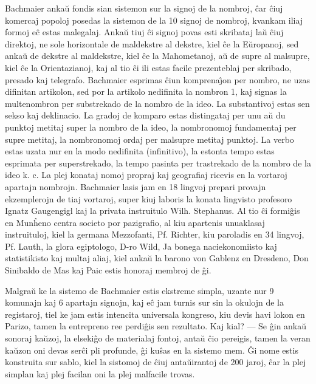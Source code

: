    Bachmaier anka\u u fondis sian sistemon sur la signoj de la nombroj,
\^car \^ciuj komercaj popoloj posedas la sistemon de la 10 signoj de
nombroj, kvankam iliaj formoj e\^c estas malegalaj. Anka\u u tiuj
\^ci signoj povas esti skribataj la\u u \^ciuj direktoj, ne sole
horizontale de maldekstre al dekstre, kiel \^ce la E\u uropanoj, sed
anka\u u de dekstre al maldekstre, kiel \^ce la Mahometanoj, a\u u
de supre al malsupre, kiel \^ce la Orientazianoj, kaj al tio \^ci
ili estas facile prezenteblaj per skribado, presado kaj telegrafo.
Bachmaier esprimas \^ciun komprena\^{\j}on per nombro, ne uzas
difinitan artikolon, sed por la artikolo nedifinita la nombron 1,
kaj signas la multenombron per substrekado de la nombro de la ideo.
La substantivoj estas sen sekso kaj deklinacio. La gradoj de komparo
estas distingataj per unu a\u u du punktoj metitaj super la nombro
de la ideo, la nombronomoj fundamentaj per supre metitaj, la
nombronomoj ordaj per malsupre metitaj punktoj. La verbo estas uzata
nur en la modo nedifinita (infinitivo), la estonta tempo estas
esprimata per superstrekado, la tempo pasinta per trastrekado de la
nombro de la ideo k. c. La plej konataj nomoj propraj kaj geografiaj
ricevis en la vortaroj apartajn nombrojn. Bachmaier lasis jam en 18
lingvoj prepari provajn ekzemplerojn de tiaj vortaroj, super kiuj
laboris la konata lingvisto profesoro Ignatz Gaugengigl kaj la
privata instruitulo Wilh. Stephanus. Al tio \^ci formi\^gis en
Mun\^heno centra societo por pazigrafio, al kiu apartenis unuaklasaj
instruituloj, kiel la germana Mezzofanti, Pf. Richter, kiu paroladis
en 34 lingvoj, Pf. Lauth, la glora egiptologo, D-ro Wild, Ja bonega
naciekonomiisto kaj statistikisto kaj multaj aliaj, kiel anka\u u la
barono von Gablenz en Dresdeno, Don Sinibaldo de Mas kaj Paic estis
honoraj membroj de \^gi.

   Malgra\u u ke la sistemo de Bachmaier estis ekstreme simpla, uzante nur
9 komunajn kaj 6 apartajn signojn, kaj e\^c jam turnis sur sin la
okulojn de la registaroj, tiel ke jam estis intencita universala
kongreso, kiu devis havi lokon en Parizo, tamen la entrepreno ree
perdi\^gis sen rezultato. Kaj kial? --- Se \^gin anka\u u sonoraj
ka\u uzoj, la elseki\^go de materialaj fontoj, anta\u u \^cio
pereigis, tamen la veran ka\u uzon oni devas ser\^ci pli profunde,
\^gi ku\^sas en la sistemo mem. \^Gi nome estis konstruita sur
sablo, kiel la sistomoj de \^ciuj anta\u uirantoj de 200 jaroj,
\^car la plej simplan kaj plej facilan oni la plej malfacile trovas.

